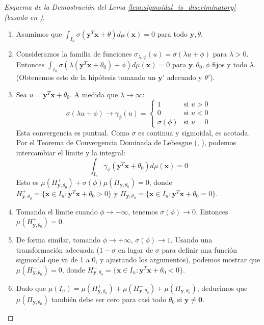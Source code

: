 \begin{proof}[Esquema de la Demostración del Lema \ref{lem:sigmoidal_is_discriminatory} (basado en \citet{Cybenko1989})]
    \begin{enumerate}
        \item Asumimos que $\int_{I_n} \sigma(\mathbf{y}^T \mathbf{x} + \theta) d\mu(\mathbf{x}) = 0$ para todo $\mathbf{y}, \theta$.
        \item Consideramos la familia de funciones $\sigma_{\lambda, \phi}(u) = \sigma(\lambda u + \phi)$ para $\lambda > 0$. Entonces $\int_{I_n} \sigma(\lambda(\mathbf{y}^T \mathbf{x} + \theta_0) + \phi) d\mu(\mathbf{x}) = 0$ para $\mathbf{y}, \theta_0, \phi$ fijos y todo $\lambda$. (Obtenemos esto de la hipótesis tomando un $\mathbf{y}'$ adecuado y $\theta'$).
        \item Sea $u = \mathbf{y}^T \mathbf{x} + \theta_0$. A medida que $\lambda \to \infty$:
        \[ \sigma(\lambda u + \phi) \to \gamma_{\phi}(u) = \begin{cases} 1 & \text{si } u > 0 \\ 0 & \text{si } u < 0 \\ \sigma(\phi) & \text{si } u = 0 \end{cases} \]
        Esta convergencia es puntual. Como $\sigma$ es continua y sigmoidal, es acotada. Por el Teorema de Convergencia Dominada de Lebesgue (, \citealt{Rudin1987}), podemos intercambiar el límite y la integral:
        \[ \int_{I_n} \gamma_{\phi}(\mathbf{y}^T \mathbf{x} + \theta_0) d\mu(\mathbf{x}) = 0 \]
        Esto es $\mu(H_{\mathbf{y},\theta_0}^+) + \sigma(\phi)\mu(\Pi_{\mathbf{y},\theta_0}) = 0$, donde $H_{\mathbf{y},\theta_0}^+ = \{\mathbf{x} \in I_n : \mathbf{y}^T \mathbf{x} + \theta_0 > 0\}$ y $\Pi_{\mathbf{y},\theta_0} = \{\mathbf{x} \in I_n : \mathbf{y}^T \mathbf{x} + \theta_0 = 0\}$.
        \item Tomando el límite cuando $\phi \to -\infty$, tenemos $\sigma(\phi) \to 0$. Entonces $\mu(H_{\mathbf{y},\theta_0}^+) = 0$.
        \item De forma similar, tomando $\phi \to +\infty$, $\sigma(\phi) \to 1$. Usando una transformación adecuada ($1-\sigma$ en lugar de $\sigma$ para definir una función sigmoidal que va de 1 a 0, y ajustando los argumentos), podemos mostrar que $\mu(H_{\mathbf{y},\theta_0}^-) = 0$, donde $H_{\mathbf{y},\theta_0}^- = \{\mathbf{x} \in I_n : \mathbf{y}^T \mathbf{x} + \theta_0 < 0\}$.
        \item Dado que $\mu(I_n) = \mu(H_{\mathbf{y},\theta_0}^+) + \mu(H_{\mathbf{y},\theta_0}^-) + \mu(\Pi_{\mathbf{y},\theta_0})$, deducimos que $\mu(\Pi_{\mathbf{y},\theta_0})$ también debe ser cero para casi todo $\theta_0$ si $\mathbf{y} \neq \mathbf{0}$.

\end{enumerate}
\end{proof}
